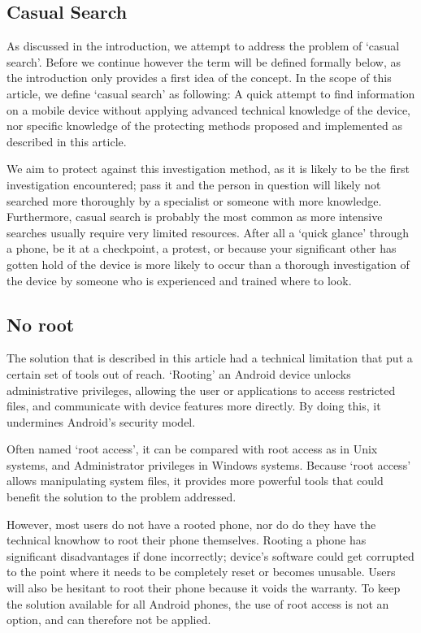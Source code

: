 \subsection{Casual Search}
As discussed in the introduction, we attempt to address the problem of `casual search'. 
Before we continue however the term will be defined formally below, as the introduction only provides a first idea of the concept.
In the scope of this article, we define `casual search' as following: A quick attempt to find information on a mobile device without applying advanced technical knowledge of the device, nor specific knowledge of the protecting methods proposed and implemented as described in this article.

We aim to protect against this investigation method, as it is likely to be the first investigation encountered; pass it and the person in question will likely not searched more thoroughly by a specialist or someone with more knowledge.
Furthermore, casual search is probably the most common as more intensive searches usually require very limited resources.
After all a `quick glance' through a phone, be it at a checkpoint, a protest, or because your significant other has gotten hold of the device is more likely to occur than a thorough investigation of the device by someone who is experienced and trained where to look.

\subsection{No root}
The solution that is described in this article had a technical limitation that put a certain set of tools out of reach.
`Rooting' an Android device unlocks administrative privileges, allowing the user or applications to access restricted files, and communicate with device features more directly.
By doing this, it undermines Android's security model\cite{vidas2011all}.

Often named `root access', it can be compared with root access as in Unix systems, and Administrator privileges in Windows systems.
Because `root access' allows manipulating system files, it provides more powerful tools that could benefit the solution to the problem addressed.

However, most users do not have a rooted phone, nor do do they have the technical knowhow to root their phone themselves. 
Rooting a phone has significant disadvantages if done incorrectly; device's software could get corrupted to the point where it needs to be completely reset or becomes unusable.
Users will also be hesitant to root their phone because it voids the warranty.
To keep the solution available for all Android phones, the use of root access is not an option, and can therefore not be applied.


